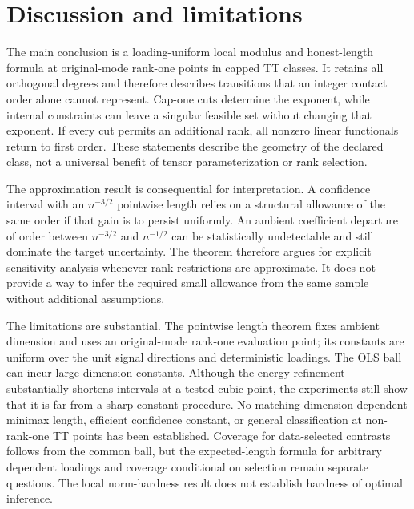 \section{Discussion and limitations}
The main conclusion is a loading-uniform local modulus and honest-length formula at original-mode rank-one points in capped TT classes. It retains all orthogonal degrees and therefore describes transitions that an integer contact order alone cannot represent. Cap-one cuts determine the exponent, while internal constraints can leave a singular feasible set without changing that exponent. If every cut permits an additional rank, all nonzero linear functionals return to first order. These statements describe the geometry of the declared class, not a universal benefit of tensor parameterization or rank selection.

The approximation result is consequential for interpretation. A confidence interval with an $n^{-3/2}$ pointwise length relies on a structural allowance of the same order if that gain is to persist uniformly. An ambient coefficient departure of order between $n^{-3/2}$ and $n^{-1/2}$ can be statistically undetectable and still dominate the target uncertainty. The theorem therefore argues for explicit sensitivity analysis whenever rank restrictions are approximate. It does not provide a way to infer the required small allowance from the same sample without additional assumptions.

The limitations are substantial. The pointwise length theorem fixes ambient dimension and uses an original-mode rank-one evaluation point; its constants are uniform over the unit signal directions and deterministic loadings. The OLS ball can incur large dimension constants. Although the energy refinement substantially shortens intervals at a tested cubic point, the experiments still show that it is far from a sharp constant procedure. No matching dimension-dependent minimax length, efficient confidence constant, or general classification at non-rank-one TT points has been established. Coverage for data-selected contrasts follows from the common ball, but the expected-length formula for arbitrary dependent loadings and coverage conditional on selection remain separate questions. The local norm-hardness result does not establish hardness of optimal inference.

